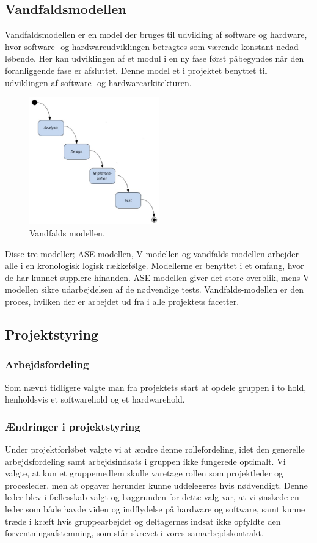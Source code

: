 \subsection{Vandfaldsmodellen}
Vandfaldsmodellen er en model der bruges til udvikling af software og hardware, hvor software- og hardwareudviklingen betragtes som værende konstant nedad løbende. Her kan udviklingen af et modul i en ny fase først påbegyndes når den foranliggende fase er afsluttet. Denne model et i projektet benyttet til udviklingen af software- og hardwarearkitekturen. 
\begin{figure}[H]
\includegraphics[width =0.5\textwidth , center]{billeder/Vandfald}
\caption{Vandfalds modellen.}
\end{figure} 
Disse tre modeller; ASE-modellen, V-modellen og vandfalds-modellen arbejder alle i en kronologisk logisk rækkefølge. Modellerne er benyttet i et omfang, hvor de har kunnet supplere hinanden. ASE-modellen giver det store overblik, mens V-modellen sikre udarbejdelsen af de nødvendige tests. Vandfalds-modellen er den proces, hvilken der er arbejdet ud fra i alle projektets facetter.   
\subsection{Projektstyring}
\subsubsection{Arbejdsfordeling}
Som nævnt tidligere valgte man fra projektets start at opdele gruppen i to hold, henholdsvis et softwarehold og et hardwarehold.
\subsubsection{Ændringer i projektstyring}
Under projektforløbet valgte vi at ændre denne rollefordeling, idet den generelle arbejdsfordeling samt arbejdsindsats i gruppen ikke fungerede optimalt. Vi valgte, at kun et gruppemedlem skulle varetage rollen som projektleder og procesleder, men at opgaver herunder kunne uddelegeres hvis nødvendigt. Denne leder blev i fællesskab valgt og baggrunden for dette valg var, at vi ønskede en leder som både havde viden og indflydelse på hardware og software, samt kunne træde i kræft hvis gruppearbejdet og deltagernes indsat ikke opfyldte den forventningsafstemning, som står skrevet i vores samarbejdskontrakt. 
